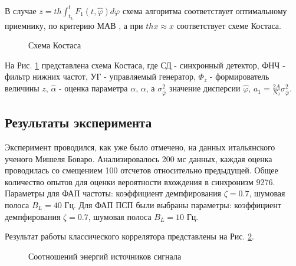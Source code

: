В случае ${z=th \int_{t_k}^t F_1(t, \hat{\varphi}) \hat{d\varphi}}$ схема алгоритма соответствует оптимальному приемнику, по критерию МАВ \cite{shahtarin-wiener-kalman}, а при ${thx \approx x}$
соответствует схеме Костаса.

\begin{figure}[h]
\center{}
	\caption{Схема Костаса}
	\label{pic:sec4_costas}
\end{figure}

На Рис. \ref{pic:sec4_costas} представлена схема Костаса, где СД - синхронный детектор, ФНЧ - фильтр нижних частот, УГ - управляемый генератор, ${\Phi_z}$ - формирователь величины ${z}$,
${\hat{\alpha}}$ - оценка параметра ${\alpha}$, ${\alpha}$, а ${\sigma_{\hat{\varphi}}^2}$ значение дисперсии ${\hat{\varphi}}$, ${a_1 = \frac{2A}{N_0} \sigma_{\hat{\varphi}}^2}$.

\subsection{Результаты эксперимента}

Эксперимент проводился, как уже было отмечено, на данных итальянского ученого Мишеля Боваро. Анализировалось 200 мс данных, каждая оценка проводилась со смещением 100 отсчетов относительно
предыдущей. Общее количество опытов для оценки вероятности вхождения в синхронизм 9276. Параметры для ФАП частоты: коэффициент демпфирования ${\zeta=0.7}$, шумовая полоса  ${B_L=40}$ Гц.
Для ФАП ПСП были выбраны параметры: коэффициент демпфирования ${\zeta=0.7}$, шумовая полоса  ${B_L=10}$ Гц.

Результат работы классического коррелятора представлены на Рис. \ref{pic:5mhz_sats_all}.
\begin{figure}[h]
\center{}
	\caption{Соотношений энергий источников сигнала}
	\label{pic:5mhz_sats_all}
\end{figure}

